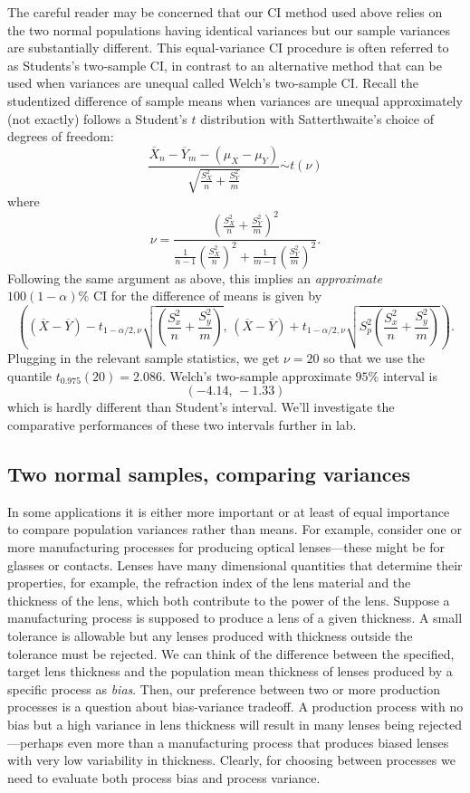 \documentclass[
]{book}
\begin{document}
The careful reader may be concerned that our CI method used above relies on the two normal populations having identical variances but our sample variances are substantially different. This equal-variance CI procedure is often referred to as Students's two-sample CI, in contrast to an alternative method that can be used when variances are unequal called Welch's two-sample CI. Recall the studentized difference of sample means when variances are unequal approximately (not exactly) follows a Student's \(t\) distribution with Satterthwaite's choice of degrees of freedom:
\[\frac{\overline X_n - \overline Y_m - (\mu_X - \mu_Y)}{\sqrt{\frac{S_X^2}{n}+\frac{S_Y^2}{m}}}\stackrel{\cdot}{\sim}t(\nu)\]
where
\[\nu = \frac{\left(\frac{S_X^2}{n}+\frac{S_Y^2}{m}\right)^2}{\frac{1}{n-1}\left(\frac{S_X^2}{n}\right)^2 + \frac{1}{m-1}\left(\frac{S_Y^2}{m}\right)^2}.\]
Following the same argument as above, this implies an \emph{approximate} \(100(1-\alpha)\%\) CI for the difference of means is given by
\[\left((\overline X - \overline Y)-t_{1-\alpha/2, \nu}\sqrt{\left(\frac{S_x^2}{n} + \frac{S_y^2}{m}\right)}, \, (\overline X - \overline Y)+t_{1-\alpha/2, \nu}\sqrt{S_p^2\left(\frac{S_x^2}{n} + \frac{S_y^2}{m}\right)}\right).\]
Plugging in the relevant sample statistics, we get \(\nu = 20\) so that we use the quantile \(t_{0.975}(20) = 2.086\). Welch's two-sample approximate \(95\%\) interval is
\[(-4.14, \,-1.33)\]
which is hardly different than Student's interval. We'll investigate the comparative performances of these two intervals further in lab.

\hypertarget{two-normal-samples-comparing-variances}{%
\subsection{Two normal samples, comparing variances}\label{two-normal-samples-comparing-variances}}

In some applications it is either more important or at least of equal importance to compare population variances rather than means. For example, consider one or more manufacturing processes for producing optical lenses---these might be for glasses or contacts. Lenses have many dimensional quantities that determine their properties, for example, the refraction index of the lens material and the thickness of the lens, which both contribute to the power of the lens. Suppose a manufacturing process is supposed to produce a lens of a given thickness. A small tolerance is allowable but any lenses produced with thickness outside the tolerance must be rejected. We can think of the difference between the specified, target lens thickness and the population mean thickness of lenses produced by a specific process as \emph{bias}. Then, our preference between two or more production processes is a question about bias-variance tradeoff. A production process with no bias but a high variance in lens thickness will result in many lenses being rejected---perhaps even more than a manufacturing process that produces biased lenses with very low variability in thickness. Clearly, for choosing between processes we need to evaluate both process bias and process variance.
\end{document}
